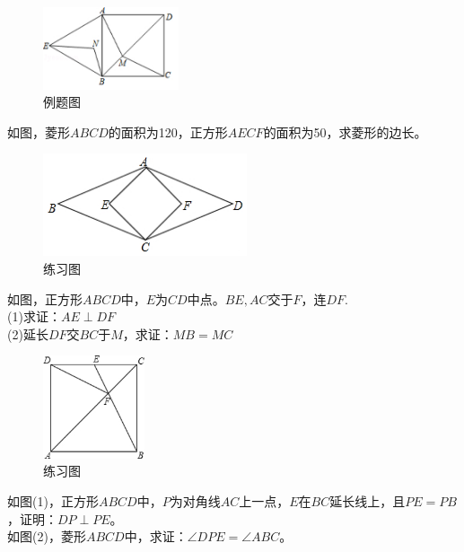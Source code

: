 \documentclass{ecnuthesis}
\begin{document}
\begin{figure}[H]
\centering
\includegraphics[width=4cm]{picture/612.png}
\caption{例题图}
\end{figure}
\begin{problem}
    如图，菱形$ABCD$的面积为120，正方形$AECF$的面积为50，求菱形的边长。\\
\end{problem}
\begin{figure}[H]
\centering
\includegraphics[width=6cm]{picture/650.png}
\caption{练习图}
\end{figure}
\begin{problem}
    如图，正方形$ABCD$中，$E$为$CD$中点。$BE,AC$交于$F$，连$DF$.\\
    (1)求证：$AE\perp DF$ \\
    (2)延长$DF$交$BC$于$M$，求证：$MB=MC$
\end{problem}
\begin{figure}[H]
\centering
\includegraphics[width=3cm]{picture/613.png}
\caption{练习图}
\end{figure}
\begin{problem}
    如图(1)，正方形$ABCD$中，$P$为对角线$AC$上一点，$E$在$BC$延长线上，且$PE=PB$，证明：$DP\perp PE$。\\
    如图(2)，菱形$ABCD$中，求证：$\angle DPE=\angle ABC$。\\
\end{problem}
\end{document}
